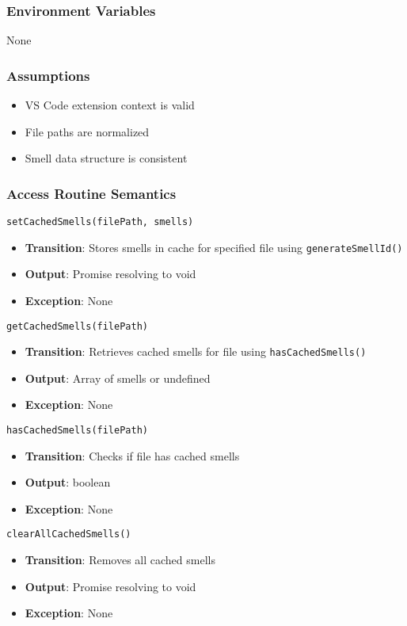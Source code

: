 \documentclass[12pt, titlepage]{article}
\begin{document}
\subsubsection{Environment Variables}
None

\subsubsection{Assumptions}
\begin{itemize}
\item VS Code extension context is valid
\item File paths are normalized
\item Smell data structure is consistent
\end{itemize}

\subsubsection{Access Routine Semantics}
\texttt{setCachedSmells(filePath, smells)}
\begin{itemize}
\item \textbf{Transition}: Stores smells in cache for specified file using \texttt{generateSmellId()}
\item \textbf{Output}: Promise resolving to void
\item \textbf{Exception}: None
\end{itemize}

\texttt{getCachedSmells(filePath)}
\begin{itemize}
\item \textbf{Transition}: Retrieves cached smells for file using \texttt{hasCachedSmells()}
\item \textbf{Output}: Array of smells or undefined
\item \textbf{Exception}: None
\end{itemize}

\texttt{hasCachedSmells(filePath)}
\begin{itemize}
\item \textbf{Transition}: Checks if file has cached smells
\item \textbf{Output}: boolean
\item \textbf{Exception}: None
\end{itemize}

\texttt{clearAllCachedSmells()}
\begin{itemize}
\item \textbf{Transition}: Removes all cached smells
\item \textbf{Output}: Promise resolving to void
\item \textbf{Exception}: None
\end{itemize}
\end{document}
